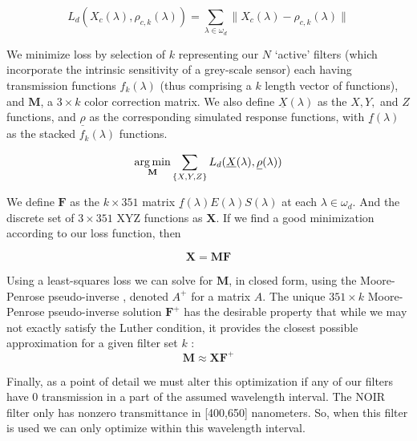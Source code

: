 \begin{equation}
    L_d({X_c}(\lambda),\rho_{c,k}(\lambda)) = \sum_{\lambda \in \omega_d}\|{X_c}(\lambda)-{\rho}_{c,k}(\lambda)\|
    \label{eq:6}
\end{equation}

We minimize loss by selection of $k$ representing our $N$ `active' filters (which incorporate the intrinsic sensitivity of a grey-scale sensor) each having transmission functions ${f}_k(\lambda)$ (thus comprising a $k$ length vector of functions), and $\boldsymbol{M}$, a $3\times k$ color correction matrix. 
We also define $\underline{X}(\lambda)$ as the $X,Y,$ and $Z$ functions, and $\underline{\rho}$ as the corresponding simulated response functions, with $\underline{f}(\lambda)$ as the stacked $f_k(\lambda)$ functions. 

\begin{equation}
    \operatorname*{arg\,min}_{\mathbf{M}} \sum_{\{X,Y,Z\}} L_d(\underline{X}(\lambda),\underline{\rho}(\lambda))
    \label{eq:7}
\end{equation}


We define $\boldsymbol{F}$ as the $k\times 351$ matrix $\underline{f}(\lambda)E(\lambda)S(\lambda)$ at each $\lambda \in \omega_d$. 
And the discrete set of $3 \times 351$ XYZ functions as $\mathbf{X}$. 
If we find a good minimization according to our loss function, then

\begin{equation}
    \boldsymbol{X} = \boldsymbol{M}\boldsymbol{F}
\end{equation}  

Using a least-squares loss we can solve for $\boldsymbol{M}$, in closed form, using the Moore-Penrose pseudo-inverse \cite{greville1960some, BEUTLER1965451}, denoted $A^+$ for a matrix $A$. 
The unique $351 \times k$ Moore-Penrose pseudo-inverse solution $\boldsymbol{F}^+$ has the desirable property that while we may not exactly satisfy the Luther condition, it provides the closest possible approximation for a given filter set $k$ \cite{macausland2014moore}:
\begin{equation}
    \boldsymbol{M} \approx \boldsymbol{X}\boldsymbol{F}^+
\end{equation} 

Finally, as a point of detail we must alter this optimization if any of our filters have 0 transmission in a part of the assumed wavelength interval. 
The NOIR filter only has nonzero transmittance in [400,650] nanometers. 
So, when this filter is used we can only optimize within this wavelength interval.

